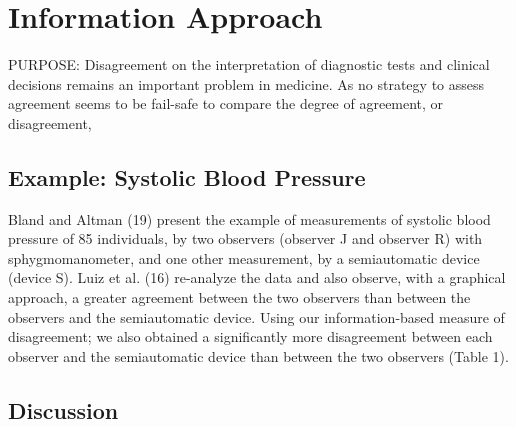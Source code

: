 \documentclass[MAIN.tex]{subfiles}
\begin{document}
	\section{Information Approach}
	
	PURPOSE: Disagreement on the interpretation of diagnostic tests and clinical decisions 
	remains an important problem in medicine. As no strategy to assess agreement seems to be 
	fail-safe to compare the degree of agreement, or disagreement, 
	
	
	
	\subsection{Example: Systolic Blood Pressure}
	Bland and Altman (19) present the example of measurements of systolic blood pressure of 85 individuals, by two observers (observer J and observer R) with sphygmomanometer, and one other measurement, by a semiautomatic device (device S). Luiz et al. (16) re-analyze the data and also observe, with a graphical approach, a greater agreement between the two observers than between the observers and the semiautomatic device. Using our information-based measure of disagreement; we also obtained a significantly more
	disagreement between each observer and the semiautomatic device than between the two observers (Table 1).
	
	
	\subsection{Discussion}
	
\end{document}
